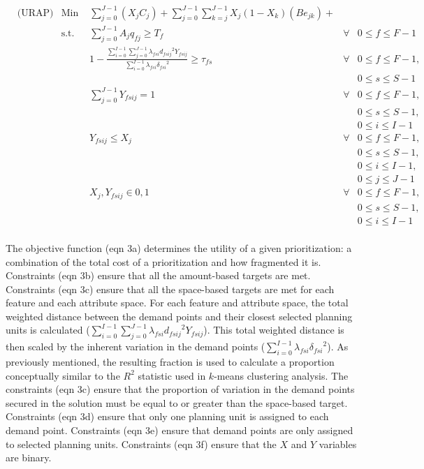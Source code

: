 \begin{align*}
& \text{(URAP)} & \text{Min } & \sum_{j=0}^{J-1} \left( X_j C_j \right) + \sum_{j=0}^{J-1} \sum_{k=j}^{J-1} X_j \left( 1-X_k \right) \left( B e_{jk} \right) + & & \tag*{eqn 3a} \\
%
& & \text{s.t. } & \sum_{j=0}^{J-1} A_j q_{fj} \geq T_{f} & \forall & 0 \leq f \leq F-1 \tag*{eqn 3b}\\
%
& & & 1 - \frac{\sum_{i=0}^{I-1} \sum_{j=0}^{J-1} \lambda_{fsi} {d_{fsij}}^{2} Y_{fsij}}{\sum_{i=0}^{I-1} \lambda_{fsi} {\delta_{fsi}}^{2}} \geq \tau_{fs} & \forall & 0 \leq f \leq F-1, \tag*{eqn 3c}\\
& & & & & 0 \leq s \leq S-1\\
%
& & & \sum_{j=0}^{J-1} Y_{fsij} = 1 & \forall & 0 \leq f \leq F-1, \tag*{eqn 3d}\\
& & & & & 0 \leq s \leq S-1, \\
& & & & & 0 \leq i \leq I-1\\
%
& & & Y_{fsij} \leq X_j & \forall & 0 \leq f \leq F-1, \tag*{eqn 3e}\\
& & & & & 0 \leq s \leq S-1, \\
& & & & & 0 \leq i \leq I-1,\\
& & & & & 0 \leq j \leq J-1\\
%
& & & X_j, Y_{fsij} \in {0,1} & \forall & 0 \leq f \leq F-1, \tag*{eqn 3f}\\
& & & & & 0 \leq s \leq S-1,\\
& & & & & 0 \leq i \leq I-1\\
%
\end{align*}

The objective function (eqn 3a) determines the utility of a given
prioritization: a combination of the total cost of a prioritization and
how fragmented it is. Constraints (eqn 3b) ensure that all the
amount-based targets are met. Constraints (eqn 3c) ensure that all the
space-based targets are met for each feature and each attribute space.
For each feature and attribute space, the total weighted distance
between the demand points and their closest selected planning units is
calculated
(\(\sum_{i=0}^{I-1} \sum_{j=0}^{J-1} \lambda_{fsi} {d_{fsij}}^{2} Y_{fsij}\)).
This total weighted distance is then scaled by the inherent variation in
the demand points
(\(\sum_{i=0}^{I-1} \lambda_{fsi} {\delta_{fsi}}^{2}\)). As previously
mentioned, the resulting fraction is used to calculate a proportion
conceptually similar to the \(R^2\) statistic used in \(k\)-means
clustering analysis. The constraints (eqn 3c) ensure that the proportion
of variation in the demand points secured in the solution must be equal
to or greater than the space-based target. Constraints (eqn 3d) ensure
that only one planning unit is assigned to each demand point.
Constraints (eqn 3e) ensure that demand points are only assigned to
selected planning units. Constraints (eqn 3f) ensure that the \(X\) and
\(Y\) variables are binary.

